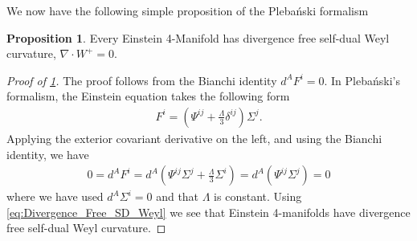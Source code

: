 \documentclass[10pt]{report}
\newcommand{\pleb}[0]{Pleba\'nski}
\theoremstyle{definition}
\newtheorem{proposition}{Proposition}[chapter]
\begin{document}
We now have the following simple proposition of the \pleb{} formalism
\begin{proposition}
    Every Einstein 4-Manifold has divergence free self-dual Weyl curvature, $\nabla \cdot W^+ = 0$. \label{rem:Einstein_Divergence_Free}
\end{proposition}
\begin{proof}[Proof of \cref{rem:Einstein_Divergence_Free}]
    The proof follows from the Bianchi identity $d^A F^i= 0$. In \pleb{}'s formalism, the Einstein equation takes the following form
    \begin{align}\label{Einstein}
        F^i = \left( \Psi^{ij} + \frac{\Lambda}{3} \delta^{ij} \right)\Sigma^j.
    \end{align}
    Applying the exterior covariant derivative on the left, and using the Bianchi identity, we have
    \begin{align}
        0 = d^A F^i = d^A \left( \Psi^{ij} \Sigma^j + \frac{\Lambda}{3} \Sigma^i \right) = d^A (\Psi^{ij} \Sigma^j ) = 0
    \end{align}
    where we have used $d^A \Sigma^i = 0$ and that $\Lambda$ is constant.
    Using \cref{eq:Divergence_Free_SD_Weyl} we see that Einstein 4-manifolds have divergence free self-dual Weyl curvature. 
\end{proof}
\end{document}

